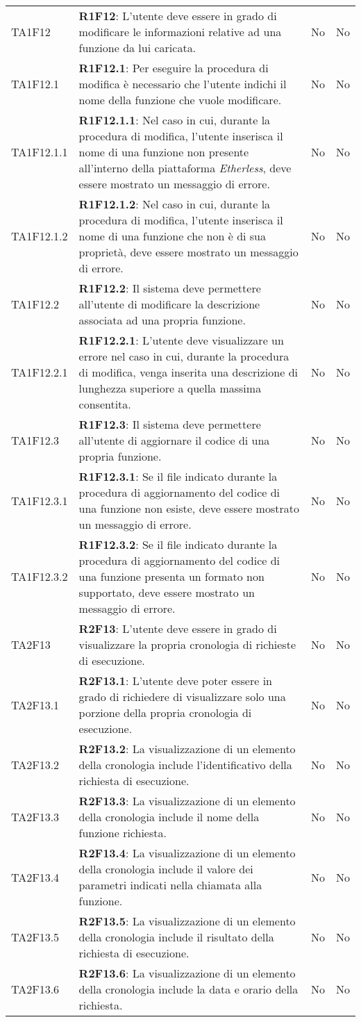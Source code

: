 \begin{longtable}{ 
		>{\centering}p{} 
		>{}p{} 
		>{\centering}p{}
		>{\centering}p{} }
	TA1F12 & \textbf{R1F12}: L'utente deve essere in grado di modificare le informazioni relative 
		ad una funzione da lui caricata. 											& No & No \tabularnewline
	TA1F12.1 & \textbf{R1F12.1}: Per eseguire la procedura di modifica è necessario che l'utente 
		indichi il nome della funzione che vuole modificare. 						& No & No \tabularnewline
	TA1F12.1.1 & \textbf{R1F12.1.1}: Nel caso in cui, durante la procedura di modifica, l'utente 
		inserisca il nome di una funzione non presente all'interno della piattaforma
		\textit{Etherless}, deve essere mostrato un messaggio di errore.			& No & No \tabularnewline
	TA1F12.1.2 & \textbf{R1F12.1.2}: Nel caso in cui, durante la procedura di modifica, l'utente 
		inserisca il nome di una funzione che non è di sua proprietà, deve essere 
		mostrato un messaggio di errore.											& No & No \tabularnewline
	TA1F12.2 & \textbf{R1F12.2}: Il sistema deve permettere all'utente di modificare la descrizione 
		associata ad una propria funzione. 											& No & No \tabularnewline
	TA1F12.2.1 & \textbf{R1F12.2.1}: L'utente deve visualizzare un errore nel caso in cui, durante 
		la procedura di modifica, venga inserita una descrizione di lunghezza
		superiore a quella massima consentita. 										& No & No \tabularnewline
	TA1F12.3 & \textbf{R1F12.3}: Il sistema deve permettere all'utente di aggiornare il codice di 
		una propria funzione. 														& No & No \tabularnewline	
	TA1F12.3.1 & \textbf{R1F12.3.1}: Se il file indicato durante la procedura di aggiornamento del 
		codice di una funzione non esiste, deve essere mostrato un messaggio di 
		errore.																		& No & No \tabularnewline
	TA1F12.3.2 & \textbf{R1F12.3.2}: Se il file indicato durante la procedura di aggiornamento del codice di una funzione presenta un formato
	non supportato, deve essere	mostrato un messaggio di errore.					& No & No \tabularnewline
		
	TA2F13 & \textbf{R2F13}: L'utente deve essere in grado di visualizzare la propria cronologia 
		di richieste di esecuzione. 													& No & No \tabularnewline
	TA2F13.1 & \textbf{R2F13.1}: L'utente deve poter essere in grado di richiedere di visualizzare
		solo una porzione della propria cronologia di esecuzione. 					& No & No \tabularnewline
	TA2F13.2 & \textbf{R2F13.2}: La visualizzazione di un elemento della cronologia include 
		l'identificativo della richiesta di esecuzione. 								& No & No \tabularnewline
	TA2F13.3 & \textbf{R2F13.3}: La visualizzazione di un elemento della cronologia include 
		il nome della funzione richiesta. 											& No & No \tabularnewline				
	TA2F13.4 & \textbf{R2F13.4}: La visualizzazione di un elemento della cronologia include 
		il valore dei parametri indicati nella chiamata alla funzione.				& No & No \tabularnewline
	TA2F13.5 & \textbf{R2F13.5}: La visualizzazione di un elemento della cronologia include 
		il risultato della richiesta di esecuzione.									& No & No \tabularnewline
	TA2F13.6 & \textbf{R2F13.6}: La visualizzazione di un elemento della cronologia include 
		la data e orario della richiesta. 											& No & No \tabularnewline
	

\end{longtable}

